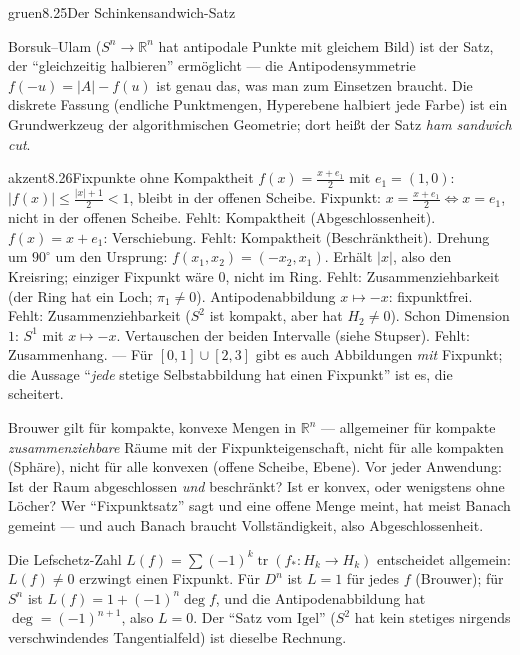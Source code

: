 \begin{loesungkarte}{gruen}{8.25}{Der Schinkensandwich-Satz}
\begin{mitnehmen}\kastentext
Borsuk--Ulam ($S^{n}\to\mathbb R^{n}$ hat antipodale Punkte mit gleichem Bild) ist der Satz, der \enquote{gleichzeitig halbieren} ermöglicht --- die Antipodensymmetrie $f(-u) = |A| - f(u)$ ist genau das, was man zum Einsetzen braucht. Die diskrete Fassung (endliche Punktmengen, Hyperebene halbiert jede Farbe) ist ein Grundwerkzeug der algorithmischen Geometrie; dort heißt der Satz \emph{ham sandwich cut}.
\end{mitnehmen}
\end{loesungkarte}

\begin{loesungkarte}{akzent}{8.26}{Fixpunkte ohne Kompaktheit}
$f(x) = \frac{x + e_1}2$ mit $e_1 = (1, 0)$: $|f(x)|\le\frac{|x| + 1}2 < 1$, bleibt in der offenen Scheibe. Fixpunkt: $x = \frac{x + e_1}2\iff x = e_1$, nicht in der offenen Scheibe. Fehlt: Kompaktheit (Abgeschlossenheit).
$f(x) = x + e_1$: Verschiebung. Fehlt: Kompaktheit (Beschränktheit).
Drehung um $90^{\circ}$ um den Ursprung: $f(x_1, x_2) = (-x_2, x_1)$. Erhält $|x|$, also den Kreisring; einziger Fixpunkt wäre $0$, nicht im Ring. Fehlt: Zusammenziehbarkeit (der Ring hat ein Loch; $\pi_1\neq0$).
Antipodenabbildung $x\mapsto-x$: fixpunktfrei. Fehlt: Zusammenziehbarkeit ($S^{2}$ ist kompakt, aber hat $H_2\neq0$). Schon Dimension $1$: $S^{1}$ mit $x\mapsto-x$.
Vertauschen der beiden Intervalle (siehe Stupser). Fehlt: Zusammenhang. --- Für $[0, 1]\cup[2, 3]$ gibt es auch Abbildungen \emph{mit} Fixpunkt; die Aussage \enquote{\emph{jede} stetige Selbstabbildung hat einen Fixpunkt} ist es, die scheitert.
\begin{fehler}\kastentext
Brouwer gilt für kompakte, konvexe Mengen in $\mathbb R^{n}$ --- allgemeiner für kompakte \emph{zusammenziehbare} Räume mit der Fixpunkteigenschaft, nicht für alle kompakten (Sphäre), nicht für alle konvexen (offene Scheibe, Ebene). Vor jeder Anwendung: Ist der Raum abgeschlossen \emph{und} beschränkt? Ist er konvex, oder wenigstens ohne Löcher? Wer \enquote{Fixpunktsatz} sagt und eine offene Menge meint, hat meist Banach gemeint --- und auch Banach braucht Vollständigkeit, also Abgeschlossenheit.
\end{fehler}
\begin{mitnehmen}\kastentext
Die Lefschetz-Zahl $L(f) = \sum(-1)^{k}\operatorname{tr}(f_{*}\colon H_k\to H_k)$ entscheidet allgemein: $L(f)\neq0$ erzwingt einen Fixpunkt. Für $D^{n}$ ist $L = 1$ für jedes $f$ (Brouwer); für $S^{n}$ ist $L(f) = 1 + (-1)^{n}\deg f$, und die Antipodenabbildung hat $\deg = (-1)^{n+1}$, also $L = 0$. Der \enquote{Satz vom Igel} ($S^{2}$ hat kein stetiges nirgends verschwindendes Tangentialfeld) ist dieselbe Rechnung.
\end{mitnehmen}
\end{loesungkarte}

